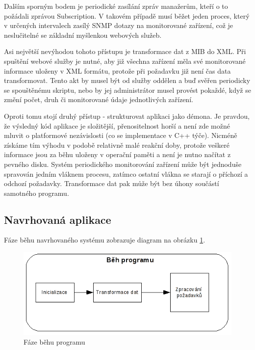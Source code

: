 Dalším sporným bodem je periodické zasílání zpráv manažerům, kteří o to požádali zprávou Subscription. V takovém případě musí běžet jeden proces, který v určených intervalech zasílý SNMP
dotazy na monitorované zařízení, což je neslučitelné se základní myšlenkou webových služeb.

Asi největší nevýhodou tohoto přístupu je transformace dat z MIB do XML. Při spuštění webové služby je nutné, aby již všechna zařízení měla své monitorované informace uloženy v XML formátu, 
protože při požadavku již není čas data transformovat. Tento akt by musel být od služby oddělen a buď svěřen periodicky se spouštěnému skriptu, nebo by jej administrátor musel provést pokaždé,
když se změní počet, druh či monitorované údaje jednotlivých zařízení.

Oproti tomu stojí druhý přístup - strukturovat aplikaci jako démona. Je pravdou, že výsledný kód aplikace je složitější, přenositelnost horší a není zde možné mluvit o platformové nezávislosti (co se implementace v C++ týče).
Nicméně získáme tím výhodu v podobě relativně malé reakční doby, protože veškeré informace jsou za běhu uloženy v operační paměti a není je nutno načítat z pevného disku. Systém periodického monitorování
zařízení může být jednoduše spravován jedním vláknem procesu, zatímco ostatní vlákna se starají o příchozí a odchozí požadavky. Transformace dat pak může být bez úhony součástí samotného programu.

\subsection{Navrhovaná aplikace}
Fáze běhu navrhovaného systému zobrazuje diagram na obrázku \ref{obr_an_beh_programu}.

\begin{figure}[htp]
	\begin{center}
		\includegraphics{obrazky/04_beh_programu.png}
		\caption{Fáze běhu programu}
		\label{obr_an_beh_programu}
	\end{center}
\end{figure}

